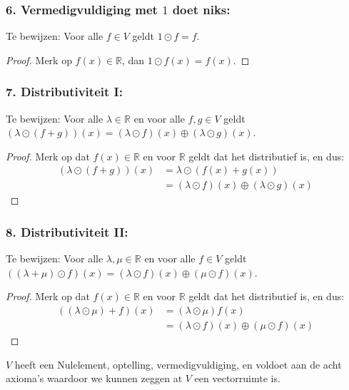 \documentclass{article}
\newcommand{\R}{\mathbb{R}}
\begin{document}
\subsubsection*{6. Vermedigvuldiging met $1$ doet niks:}
Te bewijzen: Voor alle $f \in V$ geldt $1 \odot f = f$.
\begin{proof}
    Merk op $f(x) \in \R$, dan $1 \odot f(x) = f(x)$.
\end{proof}

\subsubsection*{7. Distributiviteit I:}
Te bewijzen: Voor alle $\lambda \in \R$ en voor alle $f, g \in V$ geldt $(\lambda \odot (f + g))(x) = (\lambda \odot f)(x) \oplus (\lambda \odot g)(x)$.
\begin{proof}
    Merk op dat $f(x) \in \R$ en voor $\R$ geldt dat het distributief is, en dus:
    \begin{align*}
        (\lambda \odot (f + g))(x) & = \lambda \odot (f(x) + g(x))                      \\
                                   & = (\lambda \odot f)(x) \oplus (\lambda \odot g)(x)
    \end{align*}
\end{proof}
\subsubsection*{8. Distributiviteit II:}
Te bewijzen: Voor alle $\lambda, \mu \in \R$ en voor alle $f \in V$ geldt $((\lambda + \mu) \odot f)(x) = (\lambda \odot f)(x) \oplus (\mu \odot f)(x)$.
\begin{proof}
    Merk op dat $f(x) \in \R$ en voor $\R$ geldt dat het distributief is, en dus:
    \begin{align*}
        ((\lambda \odot \mu) + f)(x) & = (\lambda \odot \mu)f(x)                      \\
                                     & = (\lambda \odot f)(x) \oplus (\mu \odot f)(x)
    \end{align*}
\end{proof}

$V$ heeft een Nulelement, optelling, vermedigvuldiging, en voldoet aan de acht axioma's
waardoor we kunnen zeggen at $V$ een vectorruimte is.
\end{document}
